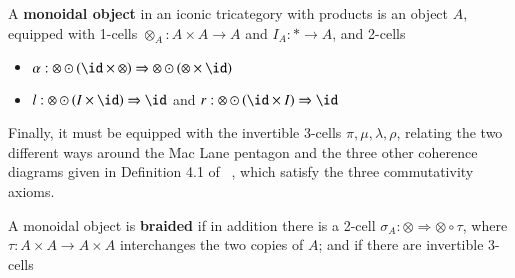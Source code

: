 \begin{defn}
A {\bf monoidal object} in an iconic tricategory with products is an object $A$, equipped with 1-cells $\otimes_A: A \times A \rightarrow A$ and $I_A: * \rightarrow A$, and 2-cells
\begin{itemize} 
\item $\alpha: \otimes \odot (\id \times \otimes) \Rightarrow \otimes \odot (\otimes \times \id)$
\item $l: \otimes \odot (I \times \id) \Rightarrow \id$ and $r:\otimes \odot (\id \times I) \Rightarrow \id$ 
\end{itemize}
Finally, it must be equipped with the invertible 3-cells $\pi, \mu, \lambda, \rho$, relating the two different ways around the Mac Lane pentagon and the three other coherence diagrams given in Definition 4.1 of ~\cite{nick:tricatsbook}, which satisfy the three commutativity axioms. 

A monoidal object is {\bf braided} if in addition there is a 2-cell $\sigma_A: \otimes \Rightarrow \otimes \circ \tau$, where $\tau: A \times A \rightarrow A \times A$ interchanges the two copies of $A$; and if there are invertible 3-cells 


\end{defn}
